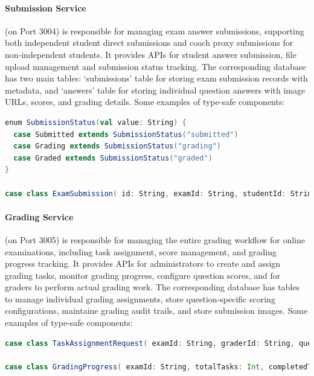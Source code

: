 \documentclass[12pt]{article}
\begin{document}
\paragraph{Submission Service} (on Port 3004) is responsible for managing exam answer submissions, supporting both independent student direct submissions and coach proxy submissions for non-independent students. It provides APIs for student answer submission, file upload management and submission status tracking. The corresponding database has two main tables: `submissions' table for storing exam submission records with metadata, and `answers' table for storing individual question answers with image URLs, scores, and grading details. Some examples of type-safe components:

\begin{lstlisting}[language=Scala]
enum SubmissionStatus(val value: String) {
  case Submitted extends SubmissionStatus("submitted")
  case Grading extends SubmissionStatus("grading")
  case Graded extends SubmissionStatus("graded")
}

case class ExamSubmission( id: String, examId: String, studentId: String, studentUsername: String, studentName: Option[String] = None, answers: List[ExamAnswer], submittedAt: LocalDateTime, status: SubmissionStatus, totalScore: Option[Double] = None, maxScore: Option[Double] = None, gradedAt: Option[LocalDateTime] = None, gradedBy: Option[String] = None, feedback: Option[String] = None, submittedBy: Option[String] = None )
\end{lstlisting}

\paragraph{Grading Service} (on Port 3005) is responsible for managing the entire grading workflow for online examinations, including task assignment, score management, and grading progress tracking. It provides APIs for administrators to create and assign grading tasks, monitor grading progress, configure question scores, and for graders to perform actual grading work. The corresponding database has tables to manage individual grading assignments, store question-specific scoring configurations, maintaine grading audit trails, and store submission images. Some examples of type-safe components:

\begin{lstlisting}[language=Scala]
case class TaskAssignmentRequest( examId: String, graderId: String, questionIds: List[String] )

case class GradingProgress( examId: String, totalTasks: Int, completedTasks: Int, inProgressTasks: Int, pendingTasks: Int, completionPercentage: BigDecimal )
\end{lstlisting}
\end{document}
